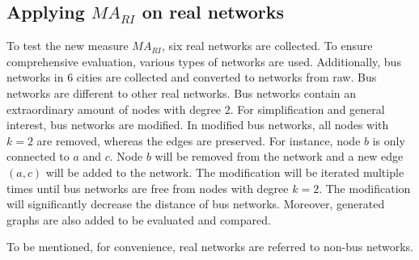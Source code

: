 \documentclass[12pt]{article}
\begin{document}
\subsection{Applying $MA_{RI}$ on real networks}
To test the new measure $MA_{RI}$, six real networks are collected. To ensure comprehensive evaluation, various types of networks are used. Additionally, bus networks in 6 cities are collected and converted to networks from raw. Bus networks are different to other real networks. Bus networks contain an extraordinary amount of nodes with degree 2. For simplification and general interest, bus networks are modified. In modified bus networks, all nodes with $k=2$ are removed, whereas the edges are preserved. For instance, node $b$ is only connected to $a$ and $c$. Node $b$ will be removed from the network and a new edge $(a,c)$ will be added to the network. The modification will be iterated multiple times until bus networks are free from nodes with degree $k=2$. The modification will significantly decrease the distance of bus networks. Moreover, generated graphs are also added to be evaluated and compared.\par
To be mentioned, for convenience, real networks are referred to non-bus networks.
\end{document}
